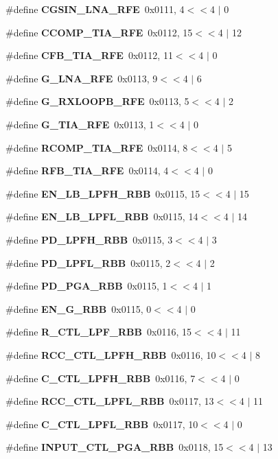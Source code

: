\begin{DoxyCompactItemize}
\item 
\#define {\bf C\+G\+S\+I\+N\+\_\+\+L\+N\+A\+\_\+\+R\+FE}~0x0111, 4$<$$<$4 $\vert$  0
\item 
\#define {\bf C\+C\+O\+M\+P\+\_\+\+T\+I\+A\+\_\+\+R\+FE}~0x0112, 15$<$$<$4 $\vert$  12
\item 
\#define {\bf C\+F\+B\+\_\+\+T\+I\+A\+\_\+\+R\+FE}~0x0112, 11$<$$<$4 $\vert$  0
\item 
\#define {\bf G\+\_\+\+L\+N\+A\+\_\+\+R\+FE}~0x0113, 9$<$$<$4 $\vert$  6
\item 
\#define {\bf G\+\_\+\+R\+X\+L\+O\+O\+P\+B\+\_\+\+R\+FE}~0x0113, 5$<$$<$4 $\vert$  2
\item 
\#define {\bf G\+\_\+\+T\+I\+A\+\_\+\+R\+FE}~0x0113, 1$<$$<$4 $\vert$  0
\item 
\#define {\bf R\+C\+O\+M\+P\+\_\+\+T\+I\+A\+\_\+\+R\+FE}~0x0114, 8$<$$<$4 $\vert$  5
\item 
\#define {\bf R\+F\+B\+\_\+\+T\+I\+A\+\_\+\+R\+FE}~0x0114, 4$<$$<$4 $\vert$  0
\item 
\#define {\bf E\+N\+\_\+\+L\+B\+\_\+\+L\+P\+F\+H\+\_\+\+R\+BB}~0x0115, 15$<$$<$4 $\vert$  15
\item 
\#define {\bf E\+N\+\_\+\+L\+B\+\_\+\+L\+P\+F\+L\+\_\+\+R\+BB}~0x0115, 14$<$$<$4 $\vert$  14
\item 
\#define {\bf P\+D\+\_\+\+L\+P\+F\+H\+\_\+\+R\+BB}~0x0115, 3$<$$<$4 $\vert$  3
\item 
\#define {\bf P\+D\+\_\+\+L\+P\+F\+L\+\_\+\+R\+BB}~0x0115, 2$<$$<$4 $\vert$  2
\item 
\#define {\bf P\+D\+\_\+\+P\+G\+A\+\_\+\+R\+BB}~0x0115, 1$<$$<$4 $\vert$  1
\item 
\#define {\bf E\+N\+\_\+\+G\+\_\+\+R\+BB}~0x0115, 0$<$$<$4 $\vert$  0
\item 
\#define {\bf R\+\_\+\+C\+T\+L\+\_\+\+L\+P\+F\+\_\+\+R\+BB}~0x0116, 15$<$$<$4 $\vert$  11
\item 
\#define {\bf R\+C\+C\+\_\+\+C\+T\+L\+\_\+\+L\+P\+F\+H\+\_\+\+R\+BB}~0x0116, 10$<$$<$4 $\vert$  8
\item 
\#define {\bf C\+\_\+\+C\+T\+L\+\_\+\+L\+P\+F\+H\+\_\+\+R\+BB}~0x0116, 7$<$$<$4 $\vert$  0
\item 
\#define {\bf R\+C\+C\+\_\+\+C\+T\+L\+\_\+\+L\+P\+F\+L\+\_\+\+R\+BB}~0x0117, 13$<$$<$4 $\vert$  11
\item 
\#define {\bf C\+\_\+\+C\+T\+L\+\_\+\+L\+P\+F\+L\+\_\+\+R\+BB}~0x0117, 10$<$$<$4 $\vert$  0
\item 
\#define {\bf I\+N\+P\+U\+T\+\_\+\+C\+T\+L\+\_\+\+P\+G\+A\+\_\+\+R\+BB}~0x0118, 15$<$$<$4 $\vert$  13

\end{DoxyCompactItemize}
